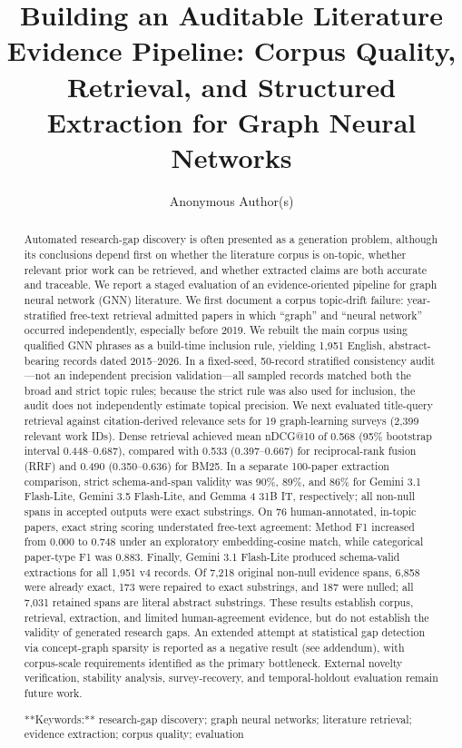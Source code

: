 \documentclass[sigconf,review,anonymous]{acmart}
\begin{document}
\title{Building an Auditable Literature Evidence Pipeline: Corpus Quality, Retrieval, and Structured Extraction for Graph Neural Networks}
\author{Anonymous Author(s)}
\begin{abstract}
Automated research-gap discovery is often presented as a generation problem, although its conclusions depend first on whether the literature corpus is on-topic, whether relevant prior work can be retrieved, and whether extracted claims are both accurate and traceable. We report a staged evaluation of an evidence-oriented pipeline for graph neural network (GNN) literature. We first document a corpus topic-drift failure: year-stratified free-text retrieval admitted papers in which “graph” and “neural network” occurred independently, especially before 2019. We rebuilt the main corpus using qualified GNN phrases as a build-time inclusion rule, yielding 1,951 English, abstract-bearing records dated 2015–2026. In a fixed-seed, 50-record stratified consistency audit—not an independent precision validation—all sampled records matched both the broad and strict topic rules; because the strict rule was also used for inclusion, the audit does not independently estimate topical precision. We next evaluated title-query retrieval against citation-derived relevance sets for 19 graph-learning surveys (2,399 relevant work IDs). Dense retrieval achieved mean nDCG@10 of 0.568 (95\% bootstrap interval 0.448–0.687), compared with 0.533 (0.397–0.667) for reciprocal-rank fusion (RRF) and 0.490 (0.350–0.636) for BM25. In a separate 100-paper extraction comparison, strict schema-and-span validity was 90\%, 89\%, and 86\% for Gemini 3.1 Flash-Lite, Gemini 3.5 Flash-Lite, and Gemma 4 31B IT, respectively; all non-null spans in accepted outputs were exact substrings. On 76 human-annotated, in-topic papers, exact string scoring understated free-text agreement: Method F1 increased from 0.000 to 0.748 under an exploratory embedding-cosine match, while categorical paper-type F1 was 0.883. Finally, Gemini 3.1 Flash-Lite produced schema-valid extractions for all 1,951 v4 records. Of 7,218 original non-null evidence spans, 6,858 were already exact, 173 were repaired to exact substrings, and 187 were nulled; all 7,031 retained spans are literal abstract substrings. These results establish corpus, retrieval, extraction, and limited human-agreement evidence, but do not establish the validity of generated research gaps. An extended attempt at statistical gap detection via concept-graph sparsity is reported as a negative result (see addendum), with corpus-scale requirements identified as the primary bottleneck. External novelty verification, stability analysis, survey-recovery, and temporal-holdout evaluation remain future work.

**Keywords:** research-gap discovery; graph neural networks; literature retrieval; evidence extraction; corpus quality; evaluation
\end{abstract}
\maketitle
\end{document}
